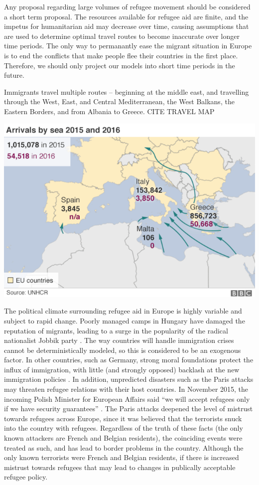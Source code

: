 \documentclass{article}
\begin{document}
Any proposal regarding large volumes of refugee movement should be considered a short term proposal. The resources available for refugee aid are finite, and the impetus for humanitarian aid may decrease over time, causing assumptions that are used to determine optimal travel routes to become inaccurate over longer time periods. The only way to permanantly ease the migrant situation in Europe is to end the conflicts that make people flee their countries in the first place. Therefore, we should only project our models into short time periods in the future.

Immigrants travel multiple routes -- beginning at the middle east, and travelling through the West, East, and Central Mediterranean, the West Balkans, the Eastern Borders, and from Albania to Greece.
CITE TRAVEL MAP

\begin{center}
\includegraphics[scale=0.5]{travelmap}
\cite{BBCgraphics}
\end{center}

The political climate surrounding refugee aid in Europe is highly variable and subject to rapid change. Poorly managed camps in Hungary have damaged the reputation of migrants, leading to a surge in the popularity of the radical nationalist Jobbik party \cite{thorpe}. The way countries will handle immigration crises cannot be deterministically modeled, so this is considered to be an exogenous factor. In other countries, such as Germany, strong moral foundations protect the influx of immigration, with little (and strongly opposed) backlash at the new immigration policies \cite{hill}. In addition, unpredicted disasters such as the Paris attacks may threaten refugee relations with their host countries. In November 2015, the incoming Polish Minister for European Affairs said ``we will accept refugees only if we have security guarantees'' \cite{hewitt}. The Paris attacks deepened the level of mistrust towards refugees across Europe, since it was believed that the terrorists snuck into the country with refugees. Regardless of the truth of these facts (the only known attackers are French and Belgian residents), the coinciding events were treated as such, and has lead to border problems in the country. Although the only known terrorists were French and Belgian residents, if there is increased mistrust towards refugees that may lead to changes in publically acceptable refugee policy.
\end{document}
